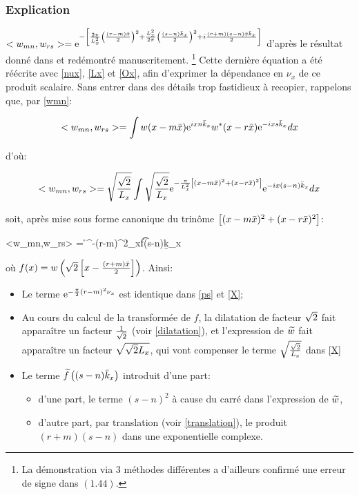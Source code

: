 \subsubsection*{Explication}


$<w_{mn},w_{rs}> = \e^{-\lb\ff[2\pi]{L_x^2}\lc\ff[(r-m)\b{x}]{2}\rc^2+\ff[L_x^2]{2\pi}\lc\ff[(s-n)\b{k}_x]{2}\rc^2
+i\ff[(r+m)(s-n)\b{x}\b{k}_x]{2}\rb}$
d'après le résultat donné dans \cite{TheseLugara} et redémontré manuscritement.
\footnote{La démonstration via 3 méthodes différentes a d'ailleurs confirmé une erreur de signe dans $(1.44)$.}
Cette dernière équation a été réécrite avec \eqref{nux}, \eqref{Lx} et \eqref{Ox}, afin d'exprimer la dépendance
en $\nu_x$ de ce produit scalaire. Sans entrer dans des détails trop fastidieux à recopier,
rappelons que, par \eqref{wmn}:

$$<w_{mn},w_{rs}> = \displaystyle\int w(x-m\bar{x})\mathrm{e}^{ixn\bar{k}_x}w^{\ast}(x-r\bar{x})\mathrm{e}^{-ixs\bar{k}_x}dx$$

d'où: 

$$
<w_{mn},w_{rs}> = \r{\ff[\r{2}]{L_x}}\Int \r{\ff[\r{2}]{L_x}}
\e^{-\ff[\pi]{L_x^2}\lb (x-m\b{x})^2+(x-r\b{x})^2\rb}\e^{-ix(s-n)\b{k}_x}dx
$$

soit, après mise sous forme canonique du trinôme $\left[ (x-m\bar{x})^2+(x-r\bar{x})^2\right]$:

\be
<w_{mn},w_{rs}> = \r{}\e^{-(r-m)^2\nu_x}\t{f}\lc(s-n)\b{k}_x\rc
\label{X}
\ee

où $f(x) = w\lc\r{2}\lb x-\ff[(r+m)\b{x}]{2}\rb\rc$. Ainsi:

\newpage


\begin{itemize}
 \item Le terme $\e^{-\ff[\pi]{2}(r-m)^2\nu_x}$ est identique dans \eqref{ps} et \eqref{X};
 \item Au cours du calcul de la transformée de $f$, la dilatation de facteur ${\sqrt{2}}$ fait apparaître un facteur
 $\ff[1]{\r{2}}$ (voir \eqref{dilatation}), et l'expression de $\widetilde{w}$ fait apparaître un facteur ${\sqrt{{\sqrt{2}}L_x}}$,
 qui vont compenser le terme $\r{\ff[\r{2}]{L_x}}$ dans \eqref{X}
 \item Le terme $\widetilde{f}\left((s-n)\bar{k}_x\right)$ introduit d'une part:
 \begin{itemize}
  \item d'une part, le terme $(s-n)^2$ à cause du carré dans l'expression de $\widetilde{w}$,
  \item d'autre part, par translation (voir \eqref{translation}), le produit $(r+m)(s-n)$ dans une exponentielle complexe.
 \end{itemize}

\end{itemize}

